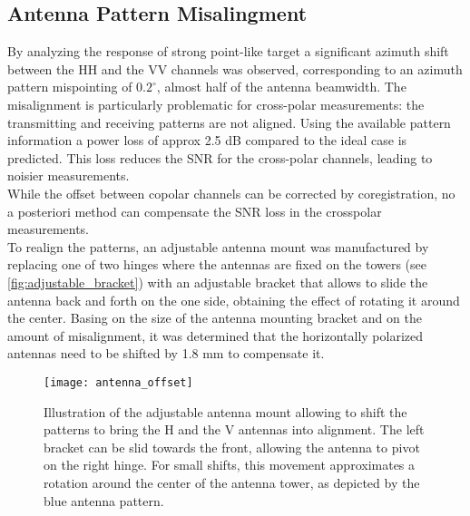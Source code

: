 \subsection{Antenna Pattern Misalingment}\label{sec:methods:misalingment}
By analyzing the response of strong point-like target a significant azimuth shift between the HH and the VV channels was observed, corresponding to an azimuth pattern mispointing of $0.2^\circ$, almost half of the antenna beamwidth.
The misalignment is particularly problematic for cross-polar measurements: the transmitting and receiving patterns are not aligned. Using the available pattern information a power loss of approx 2.5 dB  compared to the ideal case is predicted. This loss reduces the SNR for the cross-polar channels, leading to noisier measurements.\\ While the offset between copolar channels can be corrected by coregistration, no a posteriori method can compensate the SNR loss in the crosspolar measurements.\\ To realign the patterns, an adjustable antenna mount was manufactured by replacing one of two hinges where the antennas are fixed on the towers (see \autoref{fig:adjustable_bracket}) with an adjustable bracket that allows to slide the antenna back and forth on the one side, obtaining the effect of rotating it around the center. Basing on the size of the antenna mounting bracket and on the amount of misalignment, it was determined that the horizontally polarized antennas need to be shifted by 1.8 mm to compensate it.
\begin{figure}[Ht!]
	\centering
	\texttt{[image: antenna\_offset]}
	\caption{Illustration of the adjustable antenna mount allowing to shift the patterns to bring the H and the V antennas into alignment. The left bracket can be slid towards the front, allowing the antenna to pivot on the right hinge. For small shifts, this movement approximates a rotation around the center of the antenna tower, as depicted by the blue antenna pattern.}
	\label{fig:adjustable_bracket}
\end{figure}
